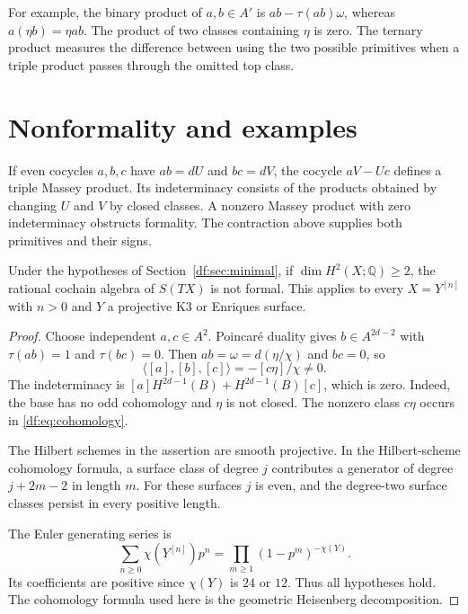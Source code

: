 For example, the binary product of $a,b\in A'$ is
$ab-\tau(ab)\omega$, whereas $a(\eta b)=\eta ab$.
The product of two classes containing $\eta$ is zero.
The ternary product measures the difference between using the two
possible primitives when a triple product passes through the omitted
top class.

\section{Nonformality and examples}
\label{df:sec:nonformal}

If even cocycles $a,b,c$ have $ab=dU$ and $bc=dV$, the cocycle
$aV-Uc$ defines a triple Massey product. Its indeterminacy consists
of the products obtained by changing $U$ and $V$ by closed classes.
A nonzero Massey product with zero indeterminacy obstructs formality.
The contraction above supplies both primitives and their signs.

\begin{corollary}\label{df:cor:nonformal}
Under the hypotheses of Section~\ref{df:sec:minimal}, if
$\dim H^2(X;\mathbb Q)\geq2$, the rational cochain algebra of
$S(TX)$ is not formal. This applies to every $X=Y^{[n]}$ with $n>0$
and $Y$ a projective K3 or Enriques surface.
\end{corollary}

\begin{proof}
Choose independent $a,c\in A^2$. Poincar\'e duality gives
$b\in A^{2d-2}$ with $\tau(ab)=1$ and $\tau(bc)=0$.
Then $ab=\omega=d(\eta/\chi)$ and $bc=0$, so
\begin{equation}\label{df:eq:massey}
 \langle[a],[b],[c]\rangle=-[c\eta]/\chi\ne0.
\end{equation}
The indeterminacy is
$[a]H^{2d-1}(B)+H^{2d-1}(B)[c]$, which is zero.
Indeed, the base has no odd cohomology and $\eta$ is not closed.
The nonzero class $c\eta$ occurs in \eqref{df:eq:cohomology}.

The Hilbert schemes in the assertion are smooth projective.
In the Hilbert-scheme cohomology formula, a surface class of degree
$j$ contributes a generator of degree $j+2m-2$ in length $m$.
For these surfaces $j$ is even, and the degree-two surface classes
persist in every positive length.

The Euler generating series is
\[
 \sum_{n\geq0}\chi(Y^{[n]})p^n
       =\prod_{m\geq1}(1-p^m)^{-\chi(Y)}.
\]
Its coefficients are positive since $\chi(Y)$ is $24$ or $12$.
Thus all hypotheses hold. The cohomology formula used here is the
geometric Heisenberg decomposition\cite{NakajimaHilbert1997}.
\end{proof}

